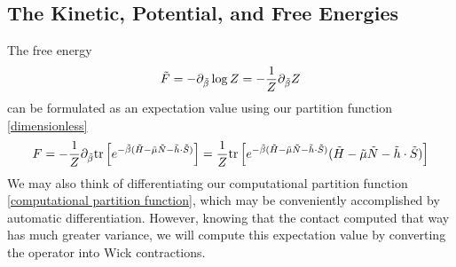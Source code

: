 \subsection{The Kinetic, Potential, and Free Energies}\label{sec:energy}

The free energy
\begin{align}
	\tilde{F} = - \partial_{\tilde{\beta}} \log Z = - \frac{1}{Z}  \partial_{\tilde{\beta}} Z
\end{align}
can be formulated as an expectation value using our partition function \eqref{dimensionless}
\begin{align}
	F
	=
	- \frac{1}{Z} \partial_{\tilde{\beta}} \text{tr}\left[ e^{-\tilde{\beta}(\tilde{H}-\tilde{\mu} \tilde{N} - \tilde{h}\cdot \tilde{S})} \right]
	=
	\frac{1}{Z} \text{tr}\left[ e^{-\tilde{\beta}(\tilde{H}-\tilde{\mu} \tilde{N} - \tilde{h}\cdot \tilde{S})} (\tilde{H}-\tilde{\mu} \tilde{N} - \tilde{h}\cdot \tilde{S})\right]
\end{align}
We may also think of differentiating our computational partition function \eqref{computational partition function}, which may be conveniently accomplished by automatic differentiation.
However, knowing that the contact  computed that way has much greater variance, we will compute this expectation value by converting the operator into Wick contractions.

